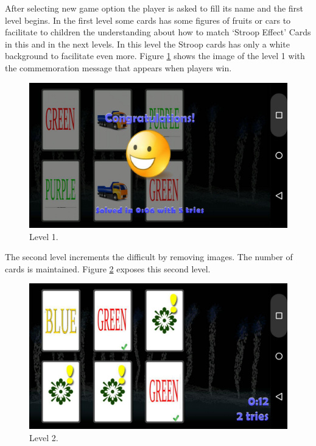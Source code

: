 After selecting new game option the player is asked to fill its name and the first level begins. In the first level some cards has some figures of fruits or cars to facilitate to children the understanding about how to match `Stroop Effect' Cards in this and in the next levels. In this level the Stroop cards has only a white background to facilitate even more. Figure \ref{lv1} shows the image of the level 1 with the commemoration message that appears when players win.

						\begin{figure}[htp]
							\begin{center}
								\includegraphics[scale=0.35]{chapters/desenvolvimento/img/memorystroop0.jpg}
								\caption{Level 1.}
								\label{lv1}
							\end{center}
						\end{figure}

The second level increments the difficult by removing images. The number of cards is maintained. Figure \ref{lv2} exposes this second level.

						\begin{figure}[htp]
							\begin{center}
								\includegraphics[scale=0.35]{chapters/desenvolvimento/img/memorystroop.jpg}
								\caption{Level 2.}
								\label{lv2}
							\end{center}
						\end{figure}

